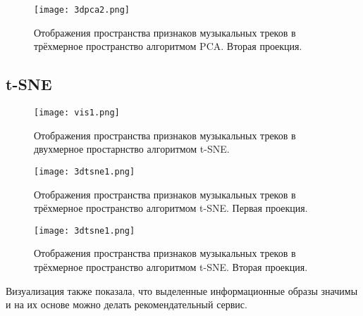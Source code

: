 \begin{figure}[h]
\centering
  \texttt{[image: 3dpca2.png]}
  \caption{Отображения пространства  признаков музыкальных треков в трёхмерное пространство алгоритмом PCA. Вторая проекция. }
  \label{fig:results:2dtsne}
\end{figure}


\subsection{t-SNE} %
\label{sub:tsne}


\begin{figure}[h]
\centering
  \texttt{[image: vis1.png]}
  \caption{Отображения пространства  признаков музыкальных треков в двухмерное простарнство алгоритмом t-SNE.}
  \label{fig:results:2dtsne}
\end{figure}

\begin{figure}[h]
\centering
  \texttt{[image: 3dtsne1.png]}
  \caption{Отображения пространства  признаков музыкальных треков в трёхмерное пространство алгоритмом t-SNE. Первая проекция. }
  \label{fig:results:2dtsne}
\end{figure}


\begin{figure}[h]
\centering
  \texttt{[image: 3dtsne1.png]}
  \caption{Отображения пространства  признаков музыкальных треков в трёхмерное пространство алгоритмом t-SNE. Вторая проекция. }
  \label{fig:results:2dtsne}
\end{figure}

Визуализация также показала, что выделенные информационные образы значимы и на их основе можно делать рекомендательный сервис. 